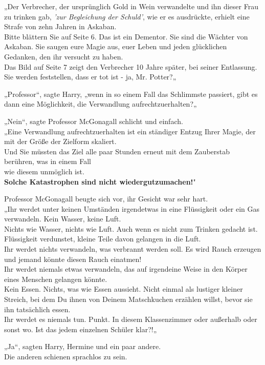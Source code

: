 {„Der Verbrecher, der ursprünglich Gold in Wein verwandelte und ihn dieser Frau zu trinken gab, \emph{'zur Begleichung der Schuld'}, wie er es ausdrückte, erhielt eine Strafe von zehn Jahren in Askaban.\\ Bitte blättern Sie auf Seite 6. Das ist ein Dementor. Sie sind die Wächter von Askaban. Sie saugen eure Magie aus, euer Leben und jeden glücklichen Gedanken, den ihr versucht zu haben.\\ Das Bild auf Seite 7 zeigt den Verbrecher 10 Jahre später, bei seiner Entlassung. Sie werden feststellen, dass er tot ist - ja, Mr. Potter?„

„Professor“, sagte Harry, „wenn in so einem Fall das Schlimmste passiert, gibt es dann eine Möglichkeit, die Verwandlung aufrechtzuerhalten?„

„Nein“, sagte Professor McGonagall schlicht und einfach.\\ „Eine Verwandlung aufrechtzuerhalten ist ein ständiger Entzug Ihrer Magie, der mit der Größe der Zielform skaliert.\\ Und Sie müssten das Ziel alle paar Stunden erneut mit dem Zauberstab berühren, was in einem Fall\\ wie diesem unmöglich ist.\\ \textbf{Solche Katastrophen sind nicht wiedergutzumachen!}"

Professor McGonagall beugte sich vor, ihr Gesicht war sehr hart.\\ „Ihr werdet unter keinen Umständen irgendetwas in eine Flüssigkeit oder ein Gas verwandeln. Kein Wasser, keine Luft.\\ Nichts wie Wasser, nichts wie Luft. Auch wenn es nicht zum Trinken gedacht ist. Flüssigkeit verdunstet, kleine Teile davon gelangen in die Luft.\\ Ihr werdet nichts verwandeln, was verbrannt werden soll. Es wird Rauch erzeugen und jemand könnte diesen Rauch einatmen!\\ Ihr werdet niemals etwas verwandeln, das auf irgendeine Weise in den Körper eines Menschen gelangen könnte.\\ Kein Essen. Nichts, was wie Essen aussieht. Nicht einmal als lustiger kleiner Streich, bei dem Du ihnen von Deinem Matschkuchen erzählen willst, bevor sie ihn tatsächlich essen.\\ Ihr werdet es niemals tun. Punkt. In diesem Klassenzimmer oder außerhalb oder sonst wo. Ist das jedem einzelnen Schüler klar?!„

„Ja“, sagten Harry, Hermine und ein paar andere.\\ Die anderen schienen sprachlos zu sein.

}
